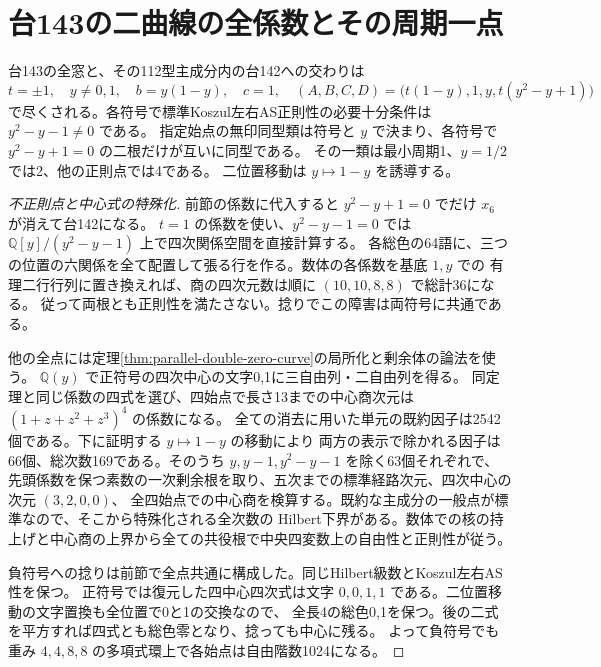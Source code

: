 \section{台143の二曲線の全係数とその周期一点}
\label{sec:parallel-septic-curve}
\begin{theorem}\label{thm:parallel-septic-curve}
台143の全窓と、その112型主成分内の台142への交わりは
\[
 t=\pm1,\quad y\ne0,1,\quad b=y(1-y),\quad c=1,\quad
 (A,B,C,D)=\bigl(t(1-y),1,y,t(y^2-y+1)\bigr)
\]
で尽くされる。各符号で標準Koszul左右AS正則性の必要十分条件は $y^2-y-1\ne0$ である。
指定始点の無印同型類は符号と $y$ で決まり、各符号で $y^2-y+1=0$ の二根だけが互いに同型である。
その一類は最小周期1、$y=1/2$ では2、他の正則点では4である。
二位置移動は $y\mapsto1-y$ を誘導する。
\end{theorem}
\begin{proof}[不正則点と中心式の特殊化]
前節の係数に代入すると $y^2-y+1=0$ でだけ $x_6$ が消えて台142になる。
$t=1$ の係数を使い、$y^2-y-1=0$ では $\mathbb Q[y]/(y^2-y-1)$ 上で四次関係空間を直接計算する。
各総色の64語に、三つの位置の六関係を全て配置して張る行を作る。数体の各係数を基底 $1,y$ での
有理二行行列に置き換えれば、商の四次元数は順に $(10,10,8,8)$ で総計36になる。
従って両根とも正則性を満たさない。捻りでこの障害は両符号に共通である。

他の全点には定理\ref{thm:parallel-double-zero-curve}の局所化と剰余体の論法を使う。
$\mathbb Q(y)$ で正符号の四次中心の文字0,1に三自由列・二自由列を得る。
同定理と同じ係数の四式を選び、四始点で長さ13までの中心商次元は $(1+z+z^2+z^3)^4$ の係数になる。
全ての消去に用いた単元の既約因子は2542個である。下に証明する $y\mapsto1-y$ の移動により
両方の表示で除かれる因子は66個、総次数169である。そのうち $y,y-1,y^2-y-1$ を除く63個それぞれで、
先頭係数を保つ素数の一次剰余根を取り、五次までの標準経路次元、四次中心の次元 $(3,2,0,0)$、
全四始点での中心商を検算する。既約な主成分の一般点が標準なので、そこから特殊化される全次数の
Hilbert下界がある。数体での核の持上げと中心商の上界から全ての共役根で中央四変数上の自由性と正則性が従う。

負符号への捻りは前節で全点共通に構成した。同じHilbert級数とKoszul左右AS性を保つ。
正符号では復元した四中心四次式は文字 $0,0,1,1$ である。二位置移動の文字置換も全位置で0と1の交換なので、
全長4の総色0,1を保つ。後の二式を平方すれば四式とも総色零となり、捻っても中心に残る。
よって負符号でも重み $4,4,8,8$ の多項式環上で各始点は自由階数1024になる。
\end{proof}

